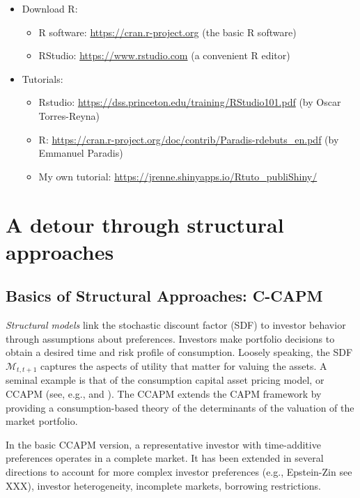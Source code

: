 \documentclass[
  12pt,
]{book}
\providecommand{\tightlist}{%
  \setlength{\itemsep}{0pt}\setlength{\parskip}{0pt}}
\theoremstyle{definition}
\theoremstyle{definition}
\theoremstyle{definition}
\theoremstyle{definition}
\theoremstyle{remark}
\begin{document}
\begin{itemize}
\item
  Download R:

  \begin{itemize}
  \tightlist
  \item
    R software: \url{https://cran.r-project.org} (the basic R software)
  \item
    RStudio: \url{https://www.rstudio.com} (a convenient R editor)
  \end{itemize}
\item
  Tutorials:

  \begin{itemize}
  \tightlist
  \item
    Rstudio: \url{https://dss.princeton.edu/training/RStudio101.pdf} (by Oscar Torres-Reyna)
  \item
    R: \url{https://cran.r-project.org/doc/contrib/Paradis-rdebuts_en.pdf} (by Emmanuel Paradis)
  \item
    My own tutorial: \url{https://jrenne.shinyapps.io/Rtuto_publiShiny/}
  \end{itemize}
\end{itemize}

\hypertarget{Structural}{%
\chapter{A detour through structural approaches}\label{Structural}}

\hypertarget{basics-of-structural-approaches-c-capm}{%
\section{Basics of Structural Approaches: C-CAPM}\label{basics-of-structural-approaches-c-capm}}

\emph{Structural models} link the stochastic discount factor (SDF) to investor behavior through assumptions about preferences. Investors make portfolio decisions to obtain a desired time and risk profile of consumption. Loosely speaking, the SDF \(\mathcal{M}_{t,t+1}\) captures the aspects of utility that matter for valuing the assets. A seminal example is that of the consumption capital asset pricing model, or CCAPM (see, e.g., \citet{Merton_1973} and \citet{BREEDEN1979265}). The CCAPM extends the CAPM framework by providing a consumption-based theory of the determinants of the valuation of the market portfolio.

In the basic CCAPM version, a representative investor with time-additive preferences operates in a complete market. It has been extended in several directions to account for more complex investor preferences (e.g., Epstein-Zin see XXX), investor heterogeneity, incomplete markets, borrowing restrictions.
\end{document}
